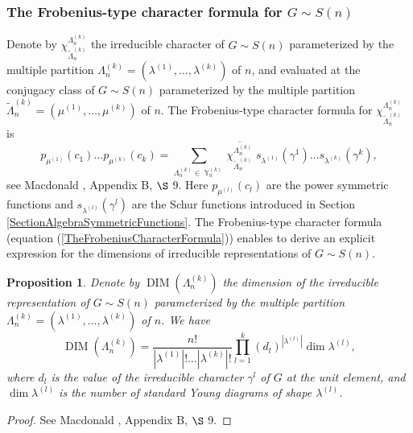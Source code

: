\documentclass[12pt]{amsart}
\newtheorem{prop}[thm]{Proposition}
\theoremstyle{definition}
\numberwithin{equation}{section}
\DeclareMathOperator{\Y}{\mathbb{Y}}
\DeclareMathOperator{\DIM}{DIM}
\newcommand{\tLambda}{\widetilde{\Lambda}}
\begin{document}
\subsubsection{The Frobenius-type character formula for $G\sim S(n)$}
Denote by $\chi^{\Lambda_n^{(k)}}_{\tLambda_n^{(k)}}$ the irreducible character of $G\sim S(n)$ parameterized by the multiple partition
$\Lambda_n^{(k)}=\left(\lambda^{(1)},\ldots,\lambda^{(k)}\right)$ of $n$, and evaluated at the conjugacy class of $G\sim S(n)$ parameterized by the multiple partition $\tLambda_n^{(k)}=\left(\mu^{(1)},\ldots,\mu^{(k)}\right)$ of $n$.
The Frobenius-type character formula for $\chi^{\Lambda_n^{(k)}}_{\tLambda_n^{(k)}}$
is
\begin{equation}\label{TheFrobeniusCharacterFormula}
p_{\mu^{(1)}}\left(c_1\right)\ldots p_{\mu^{(k)}}\left(c_k\right)
=\sum\limits_{\Lambda_n^{(k)}\in\Y_n^{(k)}}
\overline{\chi^{\Lambda_n^{(k)}}_{\tLambda_n^{(k)}}}\;
s_{\lambda^{(1)}}\left(\gamma^1\right)
\ldots s_{\lambda^{(k)}}\left(\gamma^k\right),
\end{equation}
see Macdonald \cite{Macdonald}, Appendix B, $\S$ 9.
Here $p_{\mu^{(l)}}\left(c_l\right)$ are the power symmetric functions and $s_{\lambda^{(l)}}\left(\gamma^l\right)$ are the Schur functions introduced in Section \ref{SectionAlgebraSymmetricFunctions}. The Frobenius-type character
formula (equation (\ref{TheFrobeniusCharacterFormula})) enables to derive an explicit expression for the dimensions of irreducible representations of $G\sim S(n)$.
\begin{prop}Denote by $\DIM\left(\Lambda_n^{(k)}\right)$ the dimension of the irreducible representation of $G\sim S(n)$ parameterized by the multiple partition
$\Lambda_n^{(k)}=\left(\lambda^{(1)},\ldots,\lambda^{(k)}\right)$ of $n$. We have
\begin{equation}\label{2.1.2.1}
\DIM\left(\Lambda_n^{(k)}\right)=\frac{n!}{|\lambda^{(1)}|!\ldots|\lambda^{(k)}|!}\prod\limits_{l=1}^k\left(d_l\right)^{|\lambda^{(l)}|}\dim\lambda^{(l)},
\end{equation}
where $d_l$ is the value of the irreducible character $\gamma^l$ of $G$ at the unit element, and $\dim\lambda^{(l)}$ is the number of standard Young diagrams of shape $\lambda^{(l)}$.
\end{prop}
\begin{proof} See Macdonald \cite{Macdonald}, Appendix B, $\S$ 9.
\end{proof}
\end{document}
